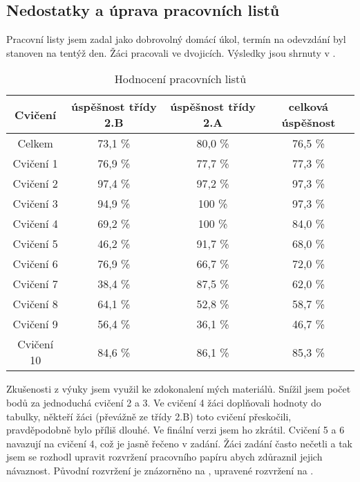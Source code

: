 \subsection{Nedostatky a úprava pracovních listů}
{Pracovní listy jsem zadal jako dobrovolný domácí úkol, termín na odevzdání byl stanoven na tentýž den. Žáci pracovali ve dvojicích. Výsledky jsou shrnuty v .}
\begin{table}[H]
    \centering
    \begin{tabular}{|c|c|c|c|}
        \hline
        Cvičení & úspěšnost třídy 2.B & úspěšnost třídy 2.A & celková úspěšnost\\
        \hline
        Celkem & 73,1 \% & 80,0 \% & 76,5 \%\\
        Cvičení 1 & 76,9 \% & 77,7 \% & 77,3 \%\\
        Cvičení 2 & 97,4 \% & 97,2 \% & 97,3 \%\\
        Cvičení 3 & 94,9 \% & 100 \% & 97,3 \%\\
        Cvičení 4 & 69,2 \% & 100 \% & 84,0 \%\\
        Cvičení 5 & 46,2 \% & 91,7 \% & 68,0 \%\\
        Cvičení 6 & 76,9 \% & 66,7 \% & 72,0 \%\\
        Cvičení 7 & 38,4 \% & 87,5 \% & 62,0 \%\\
        Cvičení 8 & 64,1 \% & 52,8 \% & 58,7 \%\\
        Cvičení 9 & 56,4 \% & 36,1 \% & 46,7 \%\\
        Cvičení 10 & 84,6 \% & 86,1 \% & 85,3 \%\\
        \hline
    \end{tabular}
    \caption{Hodnocení pracovních listů \jaTab}
    \label{tab:vysledkyPracovnichListu}
\end{table}
{Zkušenosti z výuky jsem využil ke zdokonalení mých materiálů. Snížil jsem počet bodů za jednoduchá cvičení 2 a 3. Ve cvičení 4 žáci doplňovali hodnoty do tabulky, někteří žáci (převážně ze třídy 2.B) toto cvičení přeskočili, pravděpodobně bylo příliš dlouhé. Ve finální verzi jsem ho zkrátil. Cvičení 5 a 6 navazují na cvičení 4, což je jasně řečeno v zadání. Žáci zadání často nečetli a tak jsem se rozhodl upravit rozvržení pracovního papíru abych zdůraznil jejich návaznost. Původní rozvržení je znázorněno na , upravené rozvržení na .}
